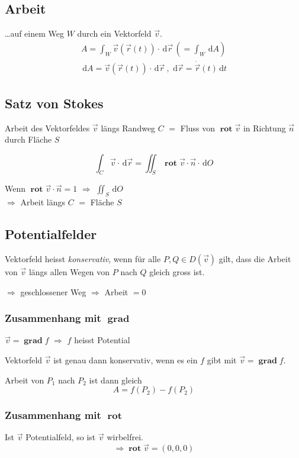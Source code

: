 \documentclass[12pt]{article}
\newcommand{\ud}{\,\mathrm{d}}
\DeclareMathOperator{\grad}{\mathbf{grad}}
\DeclareMathOperator{\rot}{\mathbf{rot}}
\begin{document}
\begin{multicols*}{3}
			\subsection{Arbeit} %
				\ldots auf einem Weg $W$ durch ein Vektorfeld $\vec{v}$.
				\begin{gather*}
					A = \int_W \vec{v}(\vec{r}(t)) \cdot \ud \vec{r}\, \left(= \int_W \ud A\right) \\
					\ud A = \vec{v}(\vec{r}(t)) \cdot \ud \vec{r}\ ,\, \ud \vec{r} = \dot{\vec{r}}(t) \ud t
				\end{gather*}
			\subsection{Satz von Stokes} %
				Arbeit des Vektorfeldes $\vec{v}$ längs Randweg $C$ $=$ Fluss von $\rot \vec{v}$ in Richtung $\vec{n}$ durch Fläche $S$
				
				\[
					\int_C \vec{v} \cdot \ud \vec{r} = \iint_S \rot \vec{v} \cdot \vec{n} \cdot \ud O
				\]
				
				Wenn $\rot \vec{v} \cdot \vec{n} = 1$ $\Rightarrow$ $\iint_S \ud O$ \\ $\Rightarrow$ Arbeit längs $C$ $=$ Fläche $S$
			\subsection{Potentialfelder} %
				Vektorfeld heisst \emph{konservativ}, wenn für alle $P,Q \in D(\vec{v})$ gilt, dass die Arbeit von $\vec{v}$ längs allen Wegen von $P$ nach $Q$ gleich gross ist.
				
				$\Rightarrow$ geschlossener Weg $\Rightarrow$ Arbeit $= 0$
				
				\subsubsection{Zusammenhang mit $\grad$} %
					$\vec{v} = \grad f$ $\Rightarrow$ $f$ heisst Potential
					
					Vektorfeld $\vec{v}$ ist genau dann konservativ, wenn es ein $f$ gibt mit $\vec{v} = \grad f$.
					
					Arbeit von $P_1$ nach $P_2$ ist dann gleich \[
						A = f(P_2) - f(P_2)
					\]
				
				\subsubsection{Zusammenhang mit $\rot$} %
					Ist $\vec{v}$ Potentialfeld, so ist $\vec{v}$ wirbelfrei.
					\[
						\Rightarrow \rot \vec{v} = (0,0,0)
					\]
					

\end{multicols*}
\end{document}

